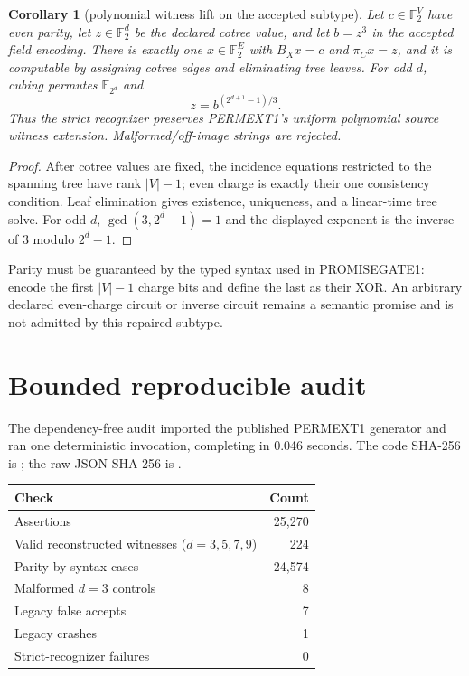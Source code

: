 \documentclass[11pt]{article}
\newtheorem{corollary}[theorem]{Corollary}
\newcommand{\F}{\mathbb F_2}
\begin{document}
\begin{corollary}[polynomial witness lift on the accepted subtype]
Let $c\in\F^V$ have even parity, let $z\in\F^d$ be the declared cotree value,
and let $b=z^3$ in the accepted field encoding.  There is exactly one
$x\in\F^E$ with $B_Xx=c$ and $\pi_Cx=z$, and it is computable by assigning
cotree edges and eliminating tree leaves.  For odd $d$, cubing permutes
$\mathbb F_{2^d}$ and
\[
 z=b^{(2^{d+1}-1)/3}.
\]
Thus the strict recognizer preserves PERMEXT1's uniform polynomial source
witness extension.  Malformed/off-image strings are rejected.
\end{corollary}
\begin{proof}
After cotree values are fixed, the incidence equations restricted to the
spanning tree have rank $|V|-1$; even charge is exactly their one consistency
condition.  Leaf elimination gives existence, uniqueness, and a linear-time
tree solve.  For odd $d$, $\gcd(3,2^d-1)=1$ and the displayed exponent is the
inverse of $3$ modulo $2^d-1$.
\end{proof}

Parity must be guaranteed by the typed syntax used in PROMISEGATE1: encode the
first $|V|-1$ charge bits and define the last as their XOR.  An arbitrary
declared even-charge circuit or inverse circuit remains a semantic promise and
is not admitted by this repaired subtype.

\section{Bounded reproducible audit}
The dependency-free audit
 imported the
published PERMEXT1 generator and ran one deterministic invocation, completing
in 0.046 seconds.  The code SHA-256 is
;
the raw JSON SHA-256 is
.

\begin{center}
\begin{tabular}{lr}
\toprule
Check & Count \\
\midrule
Assertions & 25,270 \\
Valid reconstructed witnesses ($d=3,5,7,9$) & 224 \\
Parity-by-syntax cases & 24,574 \\
Malformed $d=3$ controls & 8 \\
Legacy false accepts & 7 \\
Legacy crashes & 1 \\
Strict-recognizer failures & 0 \\
\bottomrule
\end{tabular}
\end{center}
\end{document}
